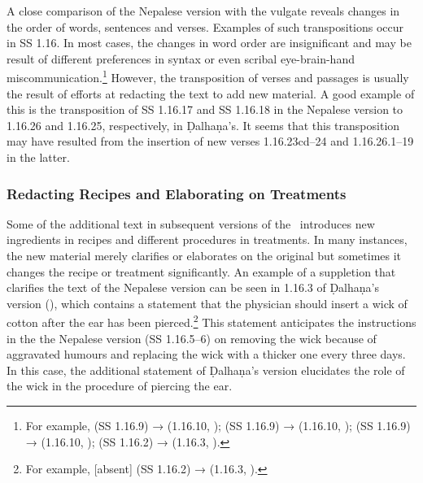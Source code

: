 A close comparison of the Nepalese version with the vulgate reveals changes in the 
order of words, sentences and verses. Examples of such transpositions occur in SS 1.16. 
In 
most cases, the changes in word order are insignificant and may be result of different 
preferences in syntax or even scribal eye-brain-hand miscommunication.\footnote{For 
example,  (SS 1.16.9) →  (1.16.10, \cite[77]{vulgate}); 
 (SS 1.16.9) →  (1.16.10, 
\cite[77]{vulgate});  (SS 1.16.9) → 
 (1.16.10, \cite[77]{vulgate}); 
(SS 1.16.2) →  (1.16.3, \cite[76]{vulgate}).} However, the transposition of verses and 
passages is usually the result of efforts at redacting the text to add new material. A good 
example of this is the transposition of SS 1.16.17 and SS 1.16.18 in the Nepalese version 
to 
1.16.26 and 1.16.25, respectively, in Ḍalhaṇa's. It seems that this transposition may have 
resulted from the insertion of new verses 1.16.23cd–24 and 1.16.26.1–19 in the latter.


%
\subsubsection{Redacting Recipes and Elaborating on Treatments}

Some of the additional text in subsequent versions of the \SS\ introduces new
ingredients in recipes and different procedures in treatments. In many instances,
the new material merely clarifies or elaborates on the original but sometimes it
changes the recipe or treatment significantly. An example of a suppletion that
clarifies the text of the Nepalese version can be seen in 1.16.3 of Ḍalhaṇa's
version (\cite[76]{vulgate}), which contains a statement that the physician should
insert a wick of cotton after the ear has been pierced.\footnote{For example,
    [absent] (SS 1.16.2) →  (1.16.3, \cite[76]{vulgate}).}
    This statement anticipates the instructions in the the Nepalese version
    (SS 1.16.5–6) on removing the wick because of aggravated humours and replacing the
    wick with a thicker one every three days. In this case, the additional statement
    of Ḍalhaṇa's version elucidates the role of the wick in the procedure of piercing
    the ear.

